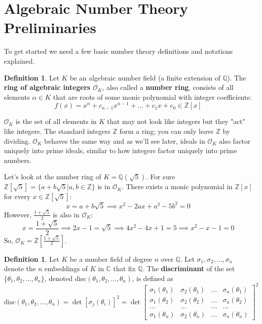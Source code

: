 \documentclass[12pt]{article}
\theoremstyle{definition}
\newtheorem{definition}[theorem]{Definition}
\begin{document}
\section{Algebraic Number Theory Preliminaries}
\label{sec:preliminaries}
To get started we need a few basic number theory definitions and notations explained. 
\begin{definition}
    Let $K$ be an algebraic number field (a finite extension of $\mathbb{Q}$). The \textbf{ring of algebraic integers $\mathcal{O}_K$}, 
    also called a \textbf{number ring}, consists of all elements $\alpha \in K$ 
    that are roots of some monic polynomial with integer coefficients:$$f(x) = x^n + c_{n-1}x^{n-1} + \dots + c_1x + c_0 \in \mathbb{Z}[x]$$
\end{definition}

$\mathcal{O}_K$ is the set of all elements in $K$ that may not look like integers but they "act" like integers. 
The standard integers $\mathbb{Z}$ form a ring; you can only leave $\mathbb{Z}$ by dividing. $\mathcal{O}_K$ behaves the same way and as we'll see later, ideals in $\mathcal{O}_K$ also factor uniquely into prime ideals, similar
to how integers factor uniquely into prime numbers. 

Let's look at the number ring of $K=\mathbb{Q}(\sqrt{5})$.
For sure $\mathbb{Z}[\sqrt{5}] = \{a+b\sqrt{5} | a,b \in \mathbb{Z}\}$ is in $\mathcal{O}_K$. There exists a monic polynomial in $\mathbb{Z}[x]$ for every $x \in \mathbb{Z}[\sqrt{5}]$:
\[
x=a+b\sqrt{5} \implies x^2 - 2ax + a^2 - 5b^2 = 0
\]
However, $\frac{1+\sqrt{5}}{2}$ is also in $\mathcal{O}_K$:
\[
x=\frac{1+\sqrt{5}}{2} \implies 2x - 1 = \sqrt{5} \implies 4x^2 -4x + 1 = 5 \implies x^2 - x - 1 = 0
\]
So, $\mathcal{O}_K = \mathbb{Z}[\frac{1+\sqrt{5}}{2}]$.
\begin{definition}
    Let $K$ be a number field of degree $n$ over $\mathbb{Q}$. Let $\sigma_1, \sigma_2, \dots, \sigma_n$ denote the
    $n$ embeddings of $K$ in $\mathbb{C}$ that fix $\mathbb{Q}$. The \textbf{discriminant} of the set $\{\theta_1, \theta_2, \dots, \theta_n\}$, denoted
    disc$(\theta_1, \theta_2, \dots, \theta_n)$, is defined as
    \[\text{disc}(\theta_1, \theta_2, \dots, \theta_n) = \det[\sigma_j(\theta_i)]^2 = 
    \det\begin{bmatrix} \sigma_1(\theta_1) & \sigma_2(\theta_1) & \dots & \sigma_n(\theta_1) \\ \sigma_1(\theta_2) & \sigma_2(\theta_2) & \dots & \sigma_n(\theta_2) \\ \dots & \dots & \dots & \dots \\ \sigma_1(\theta_n) & \sigma_2(\theta_n) & \dots & \sigma_n(\theta_n) \end{bmatrix}^2\]
\end{definition}
\end{document}
